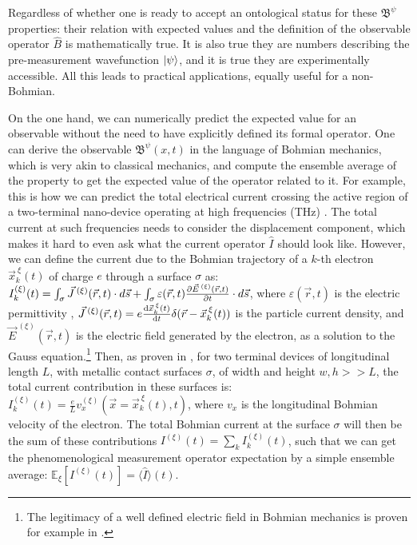 \documentclass[11pt, a4paper]{article} %
\newcommand{\B}{\mathfrak{B}}
\begin{document}
Regardless of whether one is ready to accept an ontological status for these $\B^\psi$ properties: their relation with expected values and the definition of the observable operator $\hat{B}$ is mathematically true. It is also true they are numbers describing the pre-measurement wavefunction $\ket{\psi}$, and it is true they are experimentally accessible. All this leads to practical applications, equally useful for a non-Bohmian.

On the one hand, we can numerically predict the expected value for an observable without the need to have explicitly defined its formal operator. One can derive the observable $\B^\psi(x,t)$ in the language of Bohmian mechanics, which is very akin to classical mechanics, and compute the ensemble average of the property to get the expected value of the operator related to it. For example, this is how we can predict the total electrical current crossing the active region of a two-terminal nano-device operating at high frequencies (THz) \cite{equiv, Pel}. The total current at such frequencies needs to consider the displacement component, which makes it hard to even ask what the current operator $\hat{I}$ should look like. However, we can define the current due to the Bohmian trajectory of a $k$-th electron $\vec{x}_k^{\:\xi}(t)$ of charge $e$ through a surface $\sigma$ as: $I_k^{(\xi)}(t)=\int_\sigma \vec{J}^{\:(\xi)}(\vec{r},t)\cdot d\vec{s}+\int_\sigma \varepsilon(\vec{r},t)\pdv{\vec{E}^{\:(\xi)}(\vec{r},t)}{t}\cdot d\vec{s}$, where $\varepsilon(\vec{r},t)$ is the electric permittivity , $\vec{J}^{\:(\xi)}(\vec{r},t)=e\dv{\vec{x}_k^{\:\xi}(t)}{t}\delta(\vec{r}-\vec{x}_k^{\:\xi}(t))$ is the particle current density, and $\vec{E}^{\:(\xi)}(\vec{r},t)$ is the electric field generated by the electron, as a solution to the Gauss equation.\footnote{The legitimacy of a well defined electric field in Bohmian mechanics is proven for example in \cite{lightMatter}.} Then, as proven in \cite{Pel}, for two terminal devices of longitudinal length $L$, with metallic contact surfaces $\sigma$, of width and height $w,h>>L$, the total current contribution in these surfaces is: $I^{(\xi)}_k(t)=\frac{e}{L}v_x^{(\xi)}(\vec{x}=\vec{x}_k^{\:\xi}(t), t) $, where $v_x$ is the longitudinal Bohmian velocity of the electron. The total Bohmian current at the surface $\sigma$ will then be the sum of these contributions $I^{(\xi)}(t)=\sum_k I^{(\xi)}_k(t)$, such that we can get the phenomenological measurement operator expectation by a simple ensemble average: $\mathbb{E}_\xi [I^{(\xi)}(t)]=\langle \hat{I}\rangle(t)$. 
\end{document}
